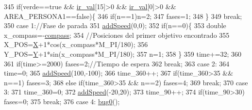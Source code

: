 \begin{DoxyCode}
345                   \textcolor{keywordflow}{if}(verde==\textcolor{keyword}{true} && \hyperlink{classRescue_aaafc15a9b059bf1acbfa360915308fe5_aaafc15a9b059bf1acbfa360915308fe5}{ir\_val}[15]>0 && \hyperlink{classRescue_aaafc15a9b059bf1acbfa360915308fe5_aaafc15a9b059bf1acbfa360915308fe5}{ir\_val}[0]>0 && AREA\_PERSONA1==\textcolor{keyword}{false})\{
346                       \textcolor{keywordflow}{if}(n==1)n=2;
347                       fases=1;
348                   \}
349                   \textcolor{keywordflow}{break};
350           \textcolor{keywordflow}{case} 1:\textcolor{comment}{//Fase de parada}
351                  \hyperlink{classRescue_a9a430924f65d71eca4e02dc9b2704947_a9a430924f65d71eca4e02dc9b2704947}{addSpeed}(0,0);
352                  \textcolor{keywordflow}{if}(n==0)\{
353                     \textcolor{keywordtype}{double} x\_compass=-\hyperlink{classRescue_a5783a7f93b5dc970e997a919af57e0bc_a5783a7f93b5dc970e997a919af57e0bc}{compass};
354                     \textcolor{comment}{//Posiciones del primer objetivo encontrado}
355                     X\_POS=\hyperlink{classRescue_ab2a4cd163b6619df49346383bb08d365_ab2a4cd163b6619df49346383bb08d365}{X}+1*cos(x\_compass*M\_PI/180);
356                     Y\_POS=\hyperlink{classRescue_aefe62362f68d14dc3f9234791de23882_aefe62362f68d14dc3f9234791de23882}{Y}+1*sin(x\_compass*M\_PI/180);
357                     n=1;
358                  \}
359                    time+=32;
360                  
361                  \textcolor{keywordflow}{if}(time>=2000) fases=2;\textcolor{comment}{//Tiempo de espera}
362                  \textcolor{keywordflow}{break};
363           \textcolor{keywordflow}{case} 2:
364                  time=0;
365                  \hyperlink{classRescue_a9a430924f65d71eca4e02dc9b2704947_a9a430924f65d71eca4e02dc9b2704947}{addSpeed}(100,-100);
366                  time\_360++;
367                  \textcolor{keywordflow}{if}(time\_360>35 && n==1) fases=3;
368                  \textcolor{keywordflow}{else} \textcolor{keywordflow}{if}(time\_360>35 && n==2) fases=4;
369                  \textcolor{keywordflow}{break};
370           \textcolor{keywordflow}{case} 3:
371                  time\_360=0;
372                  \hyperlink{classRescue_a9a430924f65d71eca4e02dc9b2704947_a9a430924f65d71eca4e02dc9b2704947}{addSpeed}(-20,20);
373                  time\_90++;
374                  \textcolor{keywordflow}{if}(time\_90>30) fases=0;
375                  \textcolor{keywordflow}{break};
376           \textcolor{keywordflow}{case} 4: \hyperlink{classRescue_a4e3ec37a662b2cb91df3dcb0a875acf9_a4e3ec37a662b2cb91df3dcb0a875acf9}{bug0}();

\end{DoxyCode}
